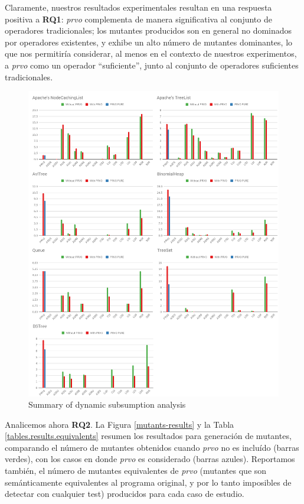 Claramente, nuestros resultados experimentales resultan en una respuesta positiva a \textbf{RQ1}: \emph{prvo} complementa de manera significativa al conjunto de operadores tradicionales; los mutantes producidos son en general no dominados por operadores existentes, y exhibe un alto n\'umero de mutantes dominantes, lo que nos permitir\'ia considerar, al menos en el contexto de nuestros experimentos, a \emph{prvo} como un operador ``suficiente'', junto al conjunto de operadores suficientes tradicionales.

\begin{figure}[t]
	\begin{center}
		\includegraphics[width=12cm]{figures/Tables.png}
	\end{center}
	\caption{Summary of dynamic subsumption analysis}
	\label{subsumption-results}
\end{figure}

Analicemos ahora \textbf{RQ2}. La Figura \ref{mutants-results} y la Tabla \ref{tables.results.equivalents} resumen los resultados para generaci\'on de mutantes, comparando el n\'umero de mutantes obtenidos cuando \emph{prvo} no es inclu\'ido (barras verdes), con los casos en donde \emph{prvo} es considerado (barras azules). Reportamos tambi\'en, el n\'umero de mutantes equivalentes de \emph{prvo} (mutantes que son sem\'anticamente equivalentes al programa original, y por lo tanto imposibles de detectar con cualquier test) producidos para cada caso de estudio.

